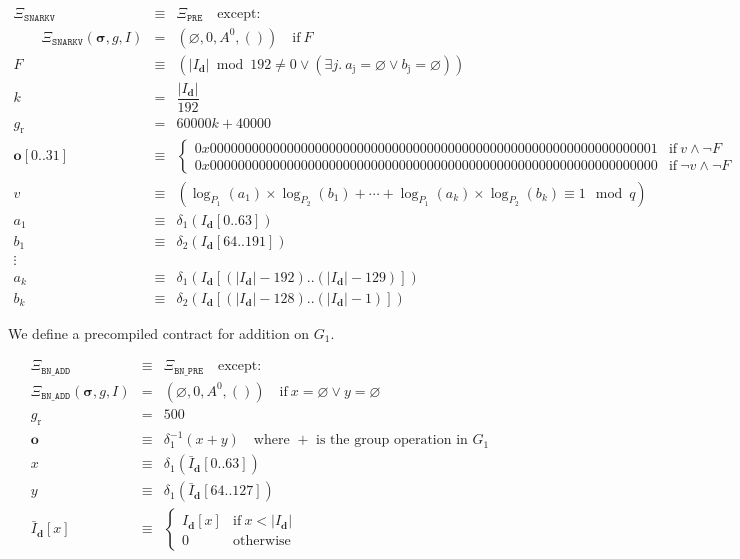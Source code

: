 \documentclass[9pt,oneside]{amsart}
\begin{document}
\begin{eqnarray}
\Xi_{\mathtt{SNARKV}}&\equiv&\Xi_{\mathtt{PRE}}\quad\text{except:}\\
\qquad\Xi_{\mathtt{SNARKV}}(\boldsymbol\sigma,g,I)&=&\left(\varnothing,0,A^0,()\right)\quad\text{if}\ F\\
F&\equiv&(|I_{\mathbf{d}}|\bmod 192\neq 0\vee(\exists j.\ a_{\mathrm{j}}=\varnothing\vee b_{\mathrm{j}}=\varnothing))\\
k &=& \dfrac{|I_{\mathbf{d}}|}{192} \\
g_{\mathrm{r}}&=& 60000k + 40000 \\
\mathbf{o}[0..31]&\equiv&\begin{cases}
0x0000000000000000000000000000000000000000000000000000000000000001&\text{if}\ v\wedge\neg F\\
0x0000000000000000000000000000000000000000000000000000000000000000&\text{if}\ \neg v\wedge\neg F
\end{cases}\\
v&\equiv&(\log_{P_1}(a_1)\times\log_{P_2}(b_1)+\cdots+\log_{P_1}(a_k)\times\log_{P_2}(b_k)\equiv 1\mod q)\\
a_1&\equiv&\delta_1(I_{\mathbf{d}}[0..63])\\
b_1&\equiv&\delta_2(I_{\mathbf{d}}[64..191])\\\nonumber
\vdots\\
a_k&\equiv&\delta_1(I_{\mathbf{d}}[(|I_{\mathbf{d}}|-192)..(|I_{\mathbf{d}}|-129)])\\
b_k&\equiv&\delta_2(I_{\mathbf{d}}[(|I_{\mathbf{d}}|-128)..(|I_{\mathbf{d}}|-1)])
\end{eqnarray}

We define a precompiled contract for addition on $G_1$.

\begin{eqnarray}
\Xi_{\mathtt{BN\_ADD}}&\equiv&\Xi_{\mathtt{BN\_PRE}}\quad\text{except:}\\
\Xi_{\mathtt{BN\_ADD}}(\boldsymbol\sigma,g,I)&=&\left(\varnothing,0,A^0,()\right)\quad\text{if}\ x=\varnothing\vee y=\varnothing\\
g_{\mathrm{r}} &=& 500\\
\mathbf{o}&\equiv&\delta_1^{-1}(x+y)\quad\text{where $+$ is the group operation in $G_1$}\\
x&\equiv&\delta_1\left(\bar I_{\mathbf{d}}[0..63]\right)\\
y&\equiv&\delta_1\left(\bar I_{\mathbf{d}}[64..127]\right)\\
\label{eq:complemented_input}\bar I_{\mathbf{d}}[x]&\equiv&\begin{cases}
I_{\mathbf{d}}[x]&\text{if}\ x < |I_{\mathbf{d}}|\\
0&\text{otherwise}
\end{cases}
\end{eqnarray}
\end{document}
